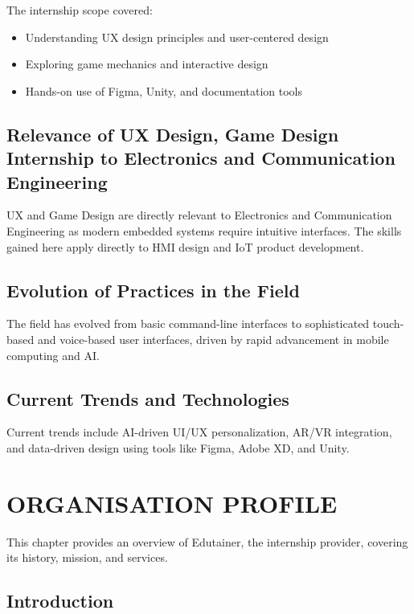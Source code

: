 \documentclass[12pt,a4paper]{report}
\begin{document}
The internship scope covered:

\begin{itemize}[leftmargin=1.5em]
    \item Understanding UX design principles and user-centered design
    \item Exploring game mechanics and interactive design
    \item Hands-on use of Figma, Unity, and documentation tools
\end{itemize}

\section{Relevance of UX Design, Game Design Internship to Electronics and Communication Engineering}

UX and Game Design are directly relevant to Electronics and Communication Engineering as modern embedded systems require intuitive interfaces. The skills gained here apply directly to HMI design and IoT product development.


\section{Evolution of Practices in the Field}

The field has evolved from basic command-line interfaces to sophisticated touch-based and voice-based user interfaces, driven by rapid advancement in mobile computing and AI.


\section{Current Trends and Technologies}

Current trends include AI-driven UI/UX personalization, AR/VR integration, and data-driven design using tools like Figma, Adobe XD, and Unity.




\chapter{ORGANISATION PROFILE}


This chapter provides an overview of Edutainer, the internship provider, covering its history, mission, and services.


\section{Introduction}
\end{document}
